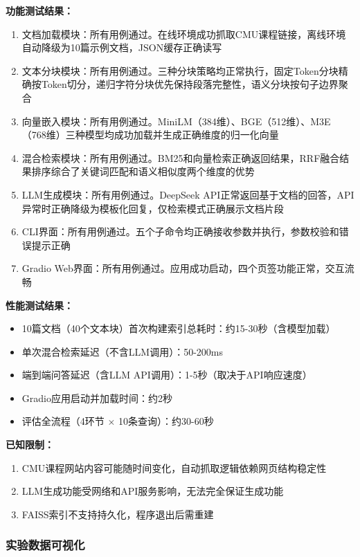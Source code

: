 \documentclass[10pt,a4paper]{article}
\begin{document}
\textbf{功能测试结果：}
\begin{enumerate}[label=(\arabic*)]
\item 文档加载模块：所有用例通过。在线环境成功抓取CMU课程链接，离线环境自动降级为10篇示例文档，JSON缓存正确读写
\item 文本分块模块：所有用例通过。三种分块策略均正常执行，固定Token分块精确按Token切分，递归字符分块优先保持段落完整性，语义分块按句子边界聚合
\item 向量嵌入模块：所有用例通过。MiniLM（384维）、BGE（512维）、M3E（768维）三种模型均成功加载并生成正确维度的归一化向量
\item 混合检索模块：所有用例通过。BM25和向量检索正确返回结果，RRF融合结果排序综合了关键词匹配和语义相似度两个维度的优势
\item LLM生成模块：所有用例通过。DeepSeek API正常返回基于文档的回答，API异常时正确降级为模板化回复，仅检索模式正确展示文档片段
\item CLI界面：所有用例通过。五个子命令均正确接收参数并执行，参数校验和错误提示正确
\item Gradio Web界面：所有用例通过。应用成功启动，四个页签功能正常，交互流畅
\end{enumerate}

\textbf{性能测试结果：}
\begin{itemize}
\item 10篇文档（40个文本块）首次构建索引总耗时：约15-30秒（含模型加载）
\item 单次混合检索延迟（不含LLM调用）：50-200ms
\item 端到端问答延迟（含LLM API调用）：1-5秒（取决于API响应速度）
\item Gradio应用启动并加载时间：约2秒
\item 评估全流程（4环节 $\times$ 10条查询）：约30-60秒
\end{itemize}

\textbf{已知限制：}
\begin{enumerate}[label=(\arabic*)]
\item CMU课程网站内容可能随时间变化，自动抓取逻辑依赖网页结构稳定性
\item LLM生成功能受网络和API服务影响，无法完全保证生成功能
\item FAISS索引不支持持久化，程序退出后需重建
\end{enumerate}

\subsubsection{实验数据可视化}
\end{document}
